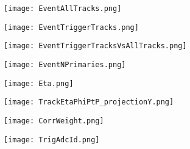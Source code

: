 \documentclass{beamer}
\begin{document}
\begin{frame}
 	\begin{figure}[h!]
	\centering
	\texttt{[image: EventAllTracks.png]}
	\end{figure}
\end{frame}

\begin{frame}
 	\begin{figure}[h!]
	\centering
	\texttt{[image: EventTriggerTracks.png]}
	\end{figure}
\end{frame}

\begin{frame}
  \begin{figure}[h!]
  \centering
  \texttt{[image: EventTriggerTracksVsAllTracks.png]}
  \end{figure}
\end{frame}

\begin{frame}
 	\begin{figure}[h!]
	\centering
	\texttt{[image: EventNPrimaries.png]}
	\end{figure}
\end{frame}

\begin{frame}
 	\begin{figure}[h!]
	\centering
	\texttt{[image: Eta.png]}
	\end{figure}
\end{frame}

\begin{frame}
  \begin{figure}[h!]
  \centering
  \texttt{[image: TrackEtaPhiPtP\_projectionY.png]}
  \end{figure}
\end{frame}

\begin{frame}
  \begin{figure}[h!]
  \centering
  \texttt{[image: CorrWeight.png]}
  \end{figure}
\end{frame}

\begin{frame}
  \begin{figure}[h!]
  \centering
  \texttt{[image: TrigAdcId.png]}
  \end{figure}
\end{frame}
\end{document}

